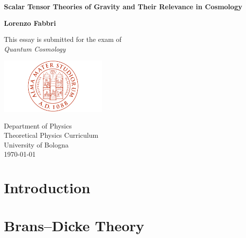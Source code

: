 \documentclass[a4paper,12pt,oneside,customfont,custombib,PageStyleII]{Settings/PhDThesisPSnPDF}
\begin{document}
\begin{titlepage}
    \begin{center}
        \vspace*{1cm}
        \Huge  
        \textbf{Scalar Tensor Theories of Gravity and Their Relevance in Cosmology}  
                
        \vspace{4cm}
        \Large    
        \textbf{Lorenzo Fabbri}
            
        \vfill
        \large   
        This essay is submitted for the exam of\\
        \textit{Quantum Cosmology}
            
        \vspace{0.8cm}
            
        \includegraphics[width=0.4\textwidth]{Graphics/UniversityCrest.png}
            
        \large
        Department of Physics\\
        Theoretical Physics Curriculum\\
        University of Bologna\\
        \today
            
    \end{center}
\end{titlepage}

\begin{spacing}{1.3}
    \tableofcontents
\end{spacing}

\mainmatter

\chapter*{Introduction}\label{chap:Introduction}


\chapter{Brans–Dicke Theory}\label{chap:chapter1}



\end{document}
